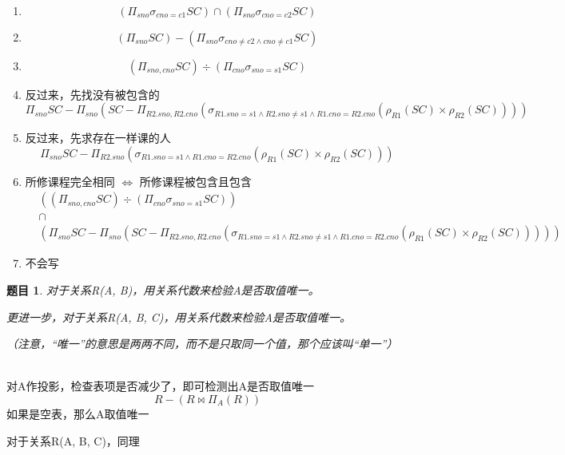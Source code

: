 \documentclass[12pt]{article} %
\theoremstyle{problemstyle} %
\newtheorem{problem}{题目} %
\newenvironment{solution}
  {%
    \renewcommand\qedsymbol{$\blacksquare$}%
    \proof[\textit{解答}]\mbox{}\vspace{-4ex}\\%
  }
  {\endproof}
\begin{document}
\begin{solution}

  \begin{enumerate}
    \item 
    \[
      (\Pi_{sno}\sigma_{cno=c1}SC)\cap (\Pi_{sno}\sigma_{cno=c2}SC)
    \]
    \item 
    \[
      (\Pi_{sno}SC) - (\Pi_{sno}\sigma_{cno\neq c2\wedge cno\neq c1}SC)
    \]
    \item 
    \[
      (\Pi_{sno, cno}SC) \div (\Pi_{cno}\sigma_{sno=s1}SC)
    \]
    \item 反过来，先找没有被包含的
    \[
      \Pi_{sno}SC-\Pi_{sno}(SC-\Pi_{R2.sno, R2.cno}(\sigma_{R1.sno=s1\wedge R2.sno\neq s1\wedge R1.cno=R2.cno}(\rho_{R1}(SC)\times \rho_{R2}(SC))))
    \]
    \item 反过来，先求存在一样课的人
    \[
      \Pi_{sno}SC-\Pi_{R2.sno}(\sigma_{R1.sno=s1\wedge R1.cno=R2.cno}(\rho_{R1}(SC)\times \rho_{R2}(SC)))
    \]
    \item 所修课程完全相同 $\Leftrightarrow$ 所修课程被包含且包含
    \begin{align*}
      &((\Pi_{sno, cno}SC) \div (\Pi_{cno}\sigma_{sno=s1}SC))\\
      &\cap\\
      &(\Pi_{sno}SC-\Pi_{sno}(SC-\Pi_{R2.sno, R2.cno}(\sigma_{R1.sno=s1\wedge R2.sno\neq s1\wedge R1.cno=R2.cno}(\rho_{R1}(SC)\times \rho_{R2}(SC)))))
    \end{align*}
    \item 不会写

  \end{enumerate}

\end{solution}

\begin{problem}
对于关系R(A, B)，用关系代数来检验A是否取值唯一。

更进一步，对于关系R(A, B, C)，用关系代数来检验A是否取值唯一。

（注意，“唯一”的意思是两两不同，而不是只取同一个值，那个应该叫“单一”）  
\end{problem}

\begin{solution}

对A作投影，检查表项是否减少了，即可检测出A是否取值唯一
\[
R-(R\bowtie\Pi_A(R))
\]
如果是空表，那么A取值唯一

对于关系R(A, B, C)，同理

\end{solution}
\end{document}

